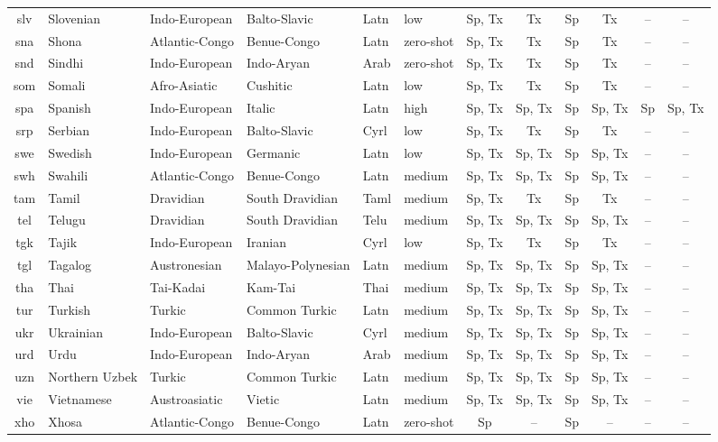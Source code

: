 \begin{table}[!p]
\begin{tabular}{clHHllcccccc}
slv & Slovenian & Indo-European & Balto-Slavic & Latn & low & Sp, Tx & Tx & Sp & Tx & -- & -- \\
sna & Shona & Atlantic-Congo & Benue-Congo & Latn & zero-shot & Sp, Tx & Tx & Sp & Tx & -- & -- \\
snd & Sindhi & Indo-European & Indo-Aryan & Arab & zero-shot & Sp, Tx & Tx & Sp & Tx & -- & -- \\
som & Somali & Afro-Asiatic & Cushitic & Latn & low & Sp, Tx & Tx & Sp & Tx & -- & -- \\
spa & Spanish & Indo-European & Italic & Latn & high & Sp, Tx & Sp, Tx  & Sp & Sp, Tx & Sp & Sp, Tx \\
srp & Serbian & Indo-European & Balto-Slavic & Cyrl & low & Sp, Tx & Tx & Sp & Tx & -- & -- \\
swe & Swedish & Indo-European & Germanic & Latn & low & Sp, Tx & Sp, Tx  & Sp & Sp, Tx & -- & -- \\
swh & Swahili & Atlantic-Congo & Benue-Congo & Latn & medium & Sp, Tx & Sp, Tx  & Sp & Sp, Tx & -- & -- \\
tam & Tamil & Dravidian & South Dravidian & Taml & medium & Sp, Tx & Tx & Sp & Tx & -- & -- \\
tel & Telugu & Dravidian & South Dravidian & Telu & medium & Sp, Tx & Sp, Tx  & Sp & Sp, Tx & -- & -- \\
tgk & Tajik & Indo-European & Iranian & Cyrl & low & Sp, Tx & Tx & Sp & Tx & -- & -- \\
tgl & Tagalog & Austronesian & Malayo-Polynesian & Latn & medium & Sp, Tx & Sp, Tx  & Sp & Sp, Tx & -- & -- \\
tha & Thai & Tai-Kadai & Kam-Tai & Thai & medium & Sp, Tx & Sp, Tx  & Sp & Sp, Tx & -- & -- \\
tur & Turkish & Turkic & Common Turkic & Latn & medium & Sp, Tx & Sp, Tx  & Sp & Sp, Tx & -- & -- \\
ukr & Ukrainian & Indo-European & Balto-Slavic & Cyrl & medium & Sp, Tx & Sp, Tx  & Sp & Sp, Tx & -- & -- \\
urd & Urdu & Indo-European & Indo-Aryan & Arab & medium & Sp, Tx & Sp, Tx  & Sp & Sp, Tx & -- & -- \\
uzn & Northern Uzbek & Turkic & Common Turkic & Latn & medium & Sp, Tx & Sp, Tx  & Sp & Sp, Tx & -- & -- \\
vie & Vietnamese & Austroasiatic & Vietic & Latn & medium & Sp, Tx & Sp, Tx  & Sp & Sp, Tx & -- & -- \\
xho & Xhosa & Atlantic-Congo & Benue-Congo & Latn & zero-shot & Sp & --  & Sp & -- & -- & -- \\

\end{tabular}
\end{table}
